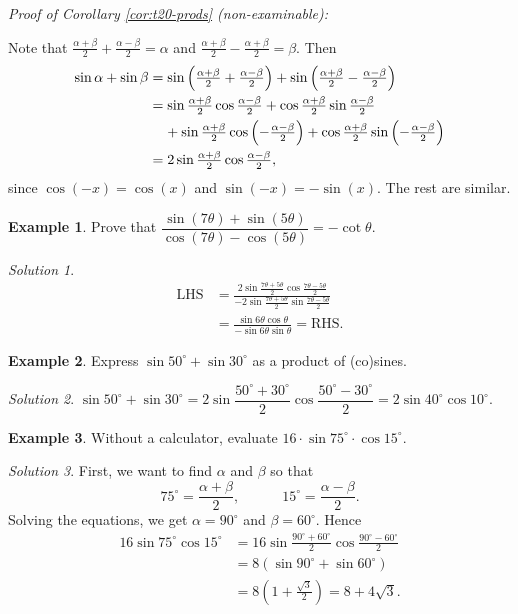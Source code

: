 \documentclass[
  english,
  12pt,
  oneside]{book}
\theoremstyle{definition}
\theoremstyle{definition}
\newtheorem{example}{Example}[chapter]
\theoremstyle{definition}
\theoremstyle{definition}
\theoremstyle{remark}
\newtheorem*{solution}{Solution}
\begin{document}
\emph{Proof of Corollary \ref{cor:t20-prods} (non-examinable):}

Note that \(\frac{\alpha+\beta}2+\frac{\alpha-\beta}2 = \alpha\) and
\(\frac{\alpha+\beta}2-\frac{\alpha+\beta}2=\beta\). Then
\begin{align*}
\sin\alpha+\sin\beta &= \sin\left(\tfrac{\alpha+\beta}2+\tfrac{\alpha-\beta}2\right) +
  \sin\left(\tfrac{\alpha+\beta}2-\tfrac{\alpha-\beta}2\right)\notag\\
 &= \sin\tfrac{\alpha+\beta}2\cos\tfrac{\alpha-\beta}2 + \cos\tfrac{\alpha+\beta}2\sin\tfrac{\alpha-\beta}2 \notag\\
 &\phantom{=}\,\,
  + \sin\tfrac{\alpha+\beta}2\cos\left(-\tfrac{\alpha-\beta}2\right) + \cos\tfrac{\alpha+\beta}2\sin\left(-\tfrac{\alpha-\beta}2\right) \notag\\
 &= 2\sin\tfrac{\alpha+\beta}2\cos\tfrac{\alpha-\beta}2,
\end{align*}
since \(\cos(-x)=\cos(x)\) and \(\sin(-x)=-\sin(x)\). The rest are similar.

\begin{example}
Prove that \(\dfrac{\sin(7\theta)+\sin(5\theta)}{\cos(7\theta) - \cos(5\theta)} = -\cot\theta.\)
\end{example}

\begin{solution}
\begin{align*}
\mathrm{LHS} &= \frac{2\sin\frac{7\theta+5\theta}{2}\cos\frac{7\theta-5\theta}{2}}{-2\sin\frac{7\theta+5\theta}{2}\sin\frac{7\theta-5\theta}{2}}\\
&= \frac{\sin6\theta\cos\theta}{-\sin6\theta\sin\theta} = \mathrm{RHS}.
\end{align*}
\end{solution}

\begin{example}
Express \(\sin50^\circ + \sin30^\circ\) as a product of (co)sines.
\end{example}

\begin{solution}
\(\sin50^\circ+\sin30^\circ = 2\sin\dfrac{50^\circ+30^\circ}{2}\cos\dfrac{50^\circ-30^\circ}{2} = 2\sin 40^\circ\cos 10^\circ\).
\end{solution}

\begin{example}
Without a calculator, evaluate \(16\cdot\sin75^\circ\cdot \cos15^\circ\).
\end{example}

\begin{solution}
First, we want to find \(\alpha\) and \(\beta\) so that
\[75^\circ=\frac{\alpha+\beta}{2}, \quad\quad\quad
15^\circ=\frac{\alpha-\beta}{2}.\]
Solving the equations, we get \(\alpha=90^\circ\) and \(\beta=60^\circ\). Hence
\begin{align*}
16\sin 75^\circ\cos15^\circ &= 16\sin\frac{90^\circ+60^\circ}{2}\cos\frac{90^\circ-60^\circ}{2}\\
&= 8(\sin90^\circ+\sin60^\circ)\\
&= 8\left(1+\frac{\sqrt3}{2}\right) = 8 + 4\sqrt{3}.
\end{align*}
\end{solution}
\end{document}
